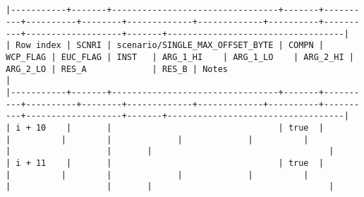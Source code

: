 \documentclass[varwidth=\maxdimen,margin=0.5cm,multi={verbatim}]{standalone}
\begin{document}
\begin{verbatim}


|-----------+-------+---------------------------------+-------+----------+----------+--------+-------------+-------------+----------+----------+-------------------+-------+-----------------------------------|
| Row index | SCNRI | scenario/SINGLE_MAX_OFFSET_BYTE | COMPN | WCP_FLAG | EUC_FLAG | INST   | ARG_1_HI    | ARG_1_LO    | ARG_2_HI | ARG_2_LO | RES_A             | RES_B | Notes                             |
|-----------+-------+---------------------------------+-------+----------+----------+--------+-------------+-------------+----------+----------+-------------------+-------+-----------------------------------|
| i + 10    |       |                                 | true  |          |          |        |             |             |          |          |                   |       |                                   |
| i + 11    |       |                                 | true  |          |          |        |             |             |          |          |                   |       |                                   |

\end{verbatim}
\end{document}
